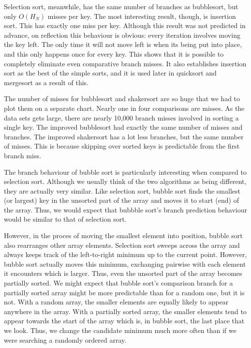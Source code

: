 Selection sort, meanwhile, has the same number of branches as bubblesort, but
only $O(H_N)$ misses per key. The most interesting result, though, is insertion
sort. This has exactly one miss per key. Although this result was not predicted
in advance, on reflection this behaviour is obvious: every iteration involves
moving the key left. The only time it will not move left is when its being put
into place, and this only happens once for every key. This shows that it is
possible to completely eliminate even comparative branch misses. It also
establishes insertion sort as the best of the simple sorts, and it is used later
in quicksort and mergesort as a result of this. \label{insertion is predictable}

The number of misses for bubblesort and shakersort are so huge that we had to
plot them on a separate chart. Nearly one in four comparisons are misses. As the
data sets gets large, there are nearly 10,000 branch misses involved in sorting
a single key. The improved bubblesort had exactly the same number of misses and
branches. The improved shakersort has a lot less branches, but the same number
of misses. This is because skipping over sorted keys is predictable from the
first branch miss.

The branch behaviour of bubble sort is particularly interesting when
compared to selection sort. Although we usually think of the two
algorithms as being different, they are actually very similar. Like
selection sort, bubble sort finds the smallest (or largest) key in the
unsorted part of the array and moves it to start (end) of the array.
Thus, we would expect that bubbble sort's branch prediction behaviour
would be similar to that of selection sort.

However, in the proces of moving the smallest element into position,
bubble sort also rearranges other array elements. Selection sort
sweeps across the array and always keeps track of the left-to-right
minimum up to the current point. However, bubble sort actually moves
this minimum, exchanging pairwise with each element it encounters
which is larger. Thus, even the unsorted part of the array becomes
partially sorted. We might expect that bubble sort's comparison branch
for a partially sorted array might be more predictable than for a
random one, but it is not. With a random array, the smaller elements
are equally likely to appear anywhere in the array. With a partially
sorted array, the smaller elements tend to appear towards the start of
the array which is, in bubble sort, the last place that we look. Thus,
we change the candidate minimum much more often than if we were
searching a randomly ordered array.



